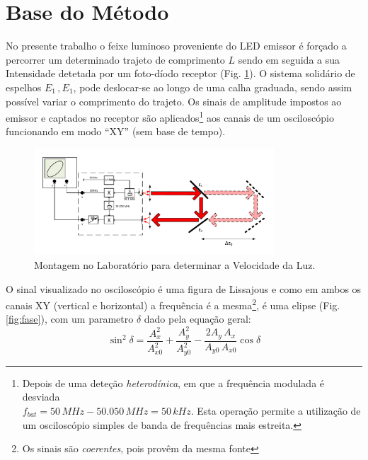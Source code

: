 \documentclass[a4paper,12pt]{article}      %
\begin{document}

\section{\sf Base do Método}
No presente trabalho o feixe luminoso proveniente do LED emissor
é forçado a percorrer um determinado trajeto de comprimento $L$ sendo em seguida a sua Intensidade  detetada
por um foto-díodo receptor (Fig. \ref{fig:Montagem}). O sistema solidário de espelhos $E_1\,, E_1$, pode deslocar-se ao longo de uma calha graduada,
sendo assim possível variar o comprimento do trajeto. Os
sinais de amplitude impostos ao emissor e captados no receptor são aplicados\footnote{Depois de uma deteção \emph{heterodínica}, em que a frequência modulada é desviada \\ 
$f_{bat}=50\, MHz -50.050\, MHz = 50\,kHz$. Esta operação permite a utilização de um osciloscópio simples de banda de frequências mais estreita.} 
aos canais de um osciloscópio funcionando em modo “XY” (sem base de tempo).

\begin{figure}[htb] 
 \centering 
	\includegraphics[width=0.8\textwidth]{Vel_esquema}
	\caption{Montagem no Laboratório para determinar a Velocidade da Luz. \label{fig:Montagem}} 
\end{figure}


O sinal visualizado no osciloscópio é uma figura de Lissajous e como em ambos os canais XY (vertical e horizontal) a frequência é a 
mesma\footnote{Os sinais são \emph{coerentes}, pois provêm da mesma fonte}, é uma elipse (Fig. \ref{fig:fase}), com um parametro $\delta$ dado pela equação geral:
\begin{equation}
	\label{eq:elipse}
	\sin^2 \delta = \frac{A_x^2}{A_{x0}^2} + \frac{A_y^2}{A_{y0}^2} - \frac{2 A_y\,A_x}{A_{y0}\,A_{x0}} \cos  \delta
\end{equation}
\end{document}
